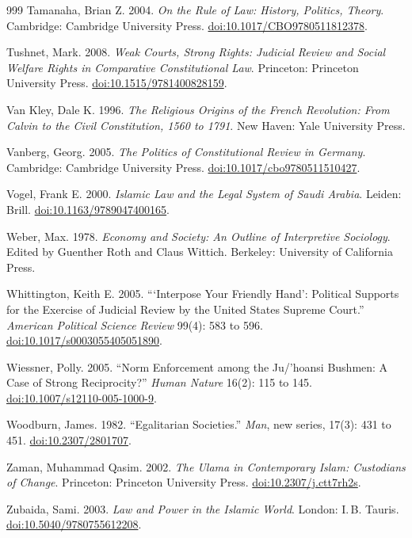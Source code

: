 \documentclass[11pt,letterpaper]{article}
\theoremstyle{definition}
\theoremstyle{remark}
\begin{document}
\begin{thebibliography}{999}
Tamanaha, Brian Z. 2004. \emph{On the Rule of Law: History, Politics, Theory}. Cambridge: Cambridge University Press. \href{https://doi.org/10.1017/CBO9780511812378}{doi:10.1017/CBO9780511812378}.

Tushnet, Mark. 2008. \emph{Weak Courts, Strong Rights: Judicial Review and Social Welfare Rights in Comparative Constitutional Law}. Princeton: Princeton University Press. \href{https://doi.org/10.1515/9781400828159}{doi:10.1515/9781400828159}.

Van Kley, Dale K. 1996. \emph{The Religious Origins of the French Revolution: From Calvin to the Civil Constitution, 1560 to 1791}. New Haven: Yale University Press.

Vanberg, Georg. 2005. \emph{The Politics of Constitutional Review in Germany}. Cambridge: Cambridge University Press. \href{https://doi.org/10.1017/cbo9780511510427}{doi:10.1017/cbo9780511510427}.

Vogel, Frank E. 2000. \emph{Islamic Law and the Legal System of Saudi Arabia}. Leiden: Brill. \href{https://doi.org/10.1163/9789047400165}{doi:10.1163/9789047400165}.

Weber, Max. 1978. \emph{Economy and Society: An Outline of Interpretive Sociology}. Edited by Guenther Roth and Claus Wittich. Berkeley: University of California Press.

Whittington, Keith E. 2005. ``\thinspace`Interpose Your Friendly Hand': Political Supports for the Exercise of Judicial Review by the United States Supreme Court.'' \emph{American Political Science Review} 99(4): 583 to 596. \href{https://doi.org/10.1017/s0003055405051890}{doi:10.1017/s0003055405051890}.

Wiessner, Polly. 2005. ``Norm Enforcement among the Ju/'hoansi Bushmen: A Case of Strong Reciprocity?'' \emph{Human Nature} 16(2): 115 to 145. \href{https://doi.org/10.1007/s12110-005-1000-9}{doi:10.1007/s12110-005-1000-9}.

Woodburn, James. 1982. ``Egalitarian Societies.'' \emph{Man}, new series, 17(3): 431 to 451. \href{https://doi.org/10.2307/2801707}{doi:10.2307/2801707}.

Zaman, Muhammad Qasim. 2002. \emph{The Ulama in Contemporary Islam: Custodians of Change}. Princeton: Princeton University Press. \href{https://doi.org/10.2307/j.ctt7rh2s}{doi:10.2307/j.ctt7rh2s}.

Zubaida, Sami. 2003. \emph{Law and Power in the Islamic World}. London: I.\,B. Tauris. \href{https://doi.org/10.5040/9780755612208}{doi:10.5040/9780755612208}.

\end{thebibliography}
\end{document}
